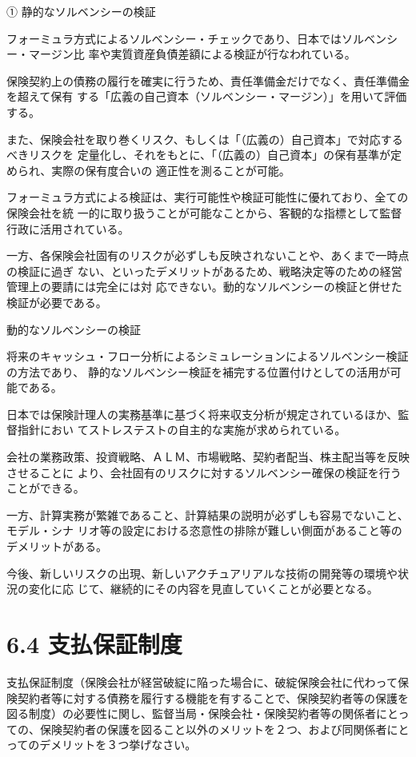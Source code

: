 \documentclass[report,gutter=10mm,fore-edge=10mm,uplatex,dvipdfmx]{jlreq}
\begin{document}
\answer{}
①
静的なソルベンシーの検証

フォーミュラ方式によるソルベンシー・チェックであり、日本ではソルベンシー・マージン比
率や実質資産負債差額による検証が行なわれている。

保険契約上の債務の履行を確実に行うため、責任準備金だけでなく、責任準備金を超えて保有
する「広義の自己資本（ソルベンシー・マージン）」を用いて評価する。

また、保険会社を取り巻くリスク、もしくは「（広義の）自己資本」で対応するべきリスクを
定量化し、それをもとに、「（広義の）自己資本」の保有基準が定められ、実際の保有度合いの
適正性を測ることが可能。

フォーミュラ方式による検証は、実行可能性や検証可能性に優れており、全ての保険会社を統
一的に取り扱うことが可能なことから、客観的な指標として監督行政に活用されている。

一方、各保険会社固有のリスクが必ずしも反映されないことや、あくまで一時点の検証に過ぎ
ない、といったデメリットがあるため、戦略決定等のための経営管理上の要請には完全には対
応できない。動的なソルベンシーの検証と併せた検証が必要である。

動的なソルベンシーの検証

将来のキャッシュ・フロー分析によるシミュレーションによるソルベンシー検証の方法であり、
静的なソルベンシー検証を補完する位置付けとしての活用が可能である。

日本では保険計理人の実務基準に基づく将来収支分析が規定されているほか、監督指針におい
てストレステストの自主的な実施が求められている。

会社の業務政策、投資戦略、ＡＬＭ、市場戦略、契約者配当、株主配当等を反映させることに
より、会社固有のリスクに対するソルベンシー確保の検証を行うことができる。

一方、計算実務が繁雑であること、計算結果の説明が必ずしも容易でないこと、モデル・シナ
リオ等の設定における恣意性の排除が難しい側面があること等のデメリットがある。

今後、新しいリスクの出現、新しいアクチュアリアルな技術の開発等の環境や状況の変化に応
じて、継続的にその内容を見直していくことが必要となる。

\section{6.4 支払保証制度}
支払保証制度（保険会社が経営破綻に陥った場合に、破綻保険会社に代わって保険契約者等に対する債務を履行する機能を有することで、保険契約者等の保護を図る制度）の必要性に関し、監督当局・保険会社・保険契約者等の関係者にとっての、保険契約者の保護を図ること以外のメリットを２つ、および同関係者にとってのデメリットを３つ挙げなさい。
\answer{}
\end{document}
